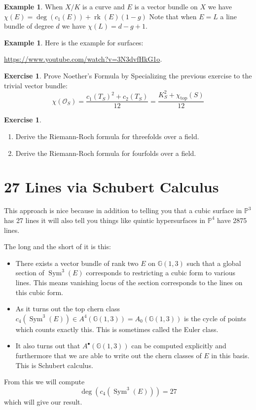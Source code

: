 \documentclass[12pt]{article}
\numberwithin{equation}{section}
\theoremstyle{definition}
\newtheorem{example}[theorem]{Example}
\newtheorem{exercise}[theorem]{Exercise}
\theoremstyle{remark}
\newcommand{\Ocal}{\mathcal{O}}
\newcommand{\PP}{\mathbb{P}}
\newcommand{\Sym}{\operatorname{Sym}}
\newcommand{\rk}{\operatorname{rk}}
\renewcommand{\top}{\operatorname{top}}
\newcommand{\GG}{\mathbb{G}}
\renewcommand{\top}{\operatorname{top}}
\begin{document}
\begin{example}
	When $X/K$ is a curve and $E$ is a vector bundle on $X$ we have 
	$\chi(E) = \deg(c_1(E)) + \rk(E)(1-g)$
	Note that when $E=L$ a line bundle of degree $d$ we have $\chi(L) = d-g+1.$
\end{example}

\begin{example}
	Here is the example for surfaces:
	\begin{center}
		\url{https://www.youtube.com/watch?v=3N3dvfHkG1o}.
	\end{center}
	
	
\end{example}

\begin{exercise}
	Prove Noether's Formula by Specializing the previous exercise to the trivial vector bundle:
	$$ \chi(\Ocal_S) = \frac{c_1(T_S)^2+c_2(T_S)}{12} = \frac{K_S^2+\chi_{\top}(S)}{12} $$
\end{exercise}

\begin{exercise}
	\begin{enumerate}
		\item Derive the Riemann-Roch formula for threefolds over a field. 
		\item Derive the Riemann-Roch formula for fourfolds over a field.
	\end{enumerate}
\end{exercise}

\section{27 Lines via Schubert Calculus}

This approach is nice because in addition to telling you that a cubic surface in $\PP^3$ has 27 lines it will also tell you things like quintic hypersurfaces in $\PP^4$ have 2875 lines. 

The long and the short of it is this: 
\begin{itemize}
	\item There exists a vector bundle of rank two $E$ on $\GG(1,3)$ such that a global section of $\Sym^3(E)$ corresponds to restricting a cubic form to various lines.
	This means vanishing locus of the section corresponds to the lines on this cubic form. 
	\item As it turns out the top chern class $c_4(\Sym^3(E)) \in A^4(\GG(1,3))=A_0(\GG(1,3))$ is the cycle of points which counts exactly this. 
	This is sometimes called the Euler class. 
	\item It also turns out that $A^{\bullet}(\GG(1,3))$ can be computed explicitly and furthermore that we are able to write out the chern classes of $E$ in this basis. This is Schubert calculus. 
\end{itemize}
From this we will compute 
$$ \deg( c_4(\Sym^3(E)) ) = 27 $$
which will give our result.
\end{document}
